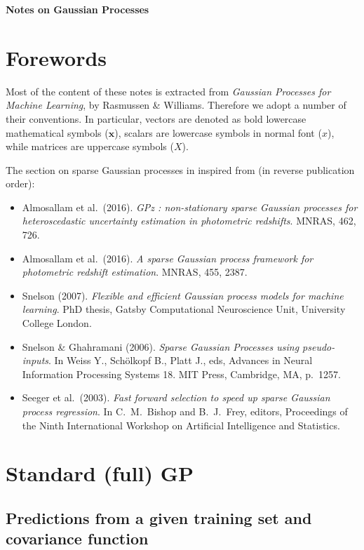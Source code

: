 \documentclass[11pt,a4paper]{article}
\numberwithin{equation}{section}
\begin{document}
{\huge \bfseries Notes on Gaussian Processes\\[1.5cm]}

\section{Forewords}

Most of the content of these notes is extracted from {\it Gaussian Processes for Machine Learning}, by Rasmussen \& Williams. Therefore we adopt a number of their conventions. In particular, vectors are denoted as bold lowercase mathematical symbols ($\mathbf{x}$), scalars are lowercase symbols in normal font ($x$), while matrices are uppercase symbols ($X$).

The section on sparse Gaussian processes in inspired from (in reverse publication order):
\begin{itemize}
  \item Almosallam et al.~(2016). {\it GPz : non-stationary sparse Gaussian processes for heteroscedastic uncertainty estimation in photometric redshifts}. MNRAS, 462, 726.
  \item Almosallam et al.~(2016). {\it A sparse Gaussian process framework for photometric redshift estimation}. MNRAS, 455, 2387.
  \item Snelson (2007). {\it Flexible and efficient Gaussian process models for machine learning}. PhD thesis, Gatsby Computational Neuroscience Unit, University College London.
  \item Snelson \& Ghahramani (2006). {\it Sparse Gaussian Processes using pseudo-inputs}. In Weiss Y., Sch\"olkopf B., Platt J., eds, Advances in Neural Information Processing Systems 18. MIT Press, Cambridge, MA, p.~1257.
  \item Seeger et al.~(2003). {\it Fast forward selection to speed up sparse Gaussian process regression}. In C.~M.~Bishop and B.~J.~Frey, editors, Proceedings of the Ninth International Workshop on Artificial Intelligence and Statistics.
\end{itemize}

\section{Standard (full) GP}

\subsection{Predictions from a given training set and covariance function}
\end{document}

